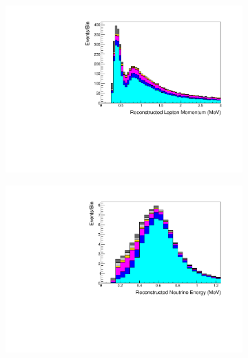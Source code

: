 \begin{figure}[h]
  \begin{subfigure}[t]{0.49\textwidth}
    \includegraphics[width=\textwidth, trim={0mm 0mm 0mm 0mm}, clip,page=1]{Figures/Selections/FHC1Rmu-2020_X.pdf}
  \end{subfigure}%
  \begin{subfigure}[t]{0.49\textwidth}
    \includegraphics[width=\textwidth, trim={0mm 0mm 0mm 0mm}, clip,page=1]{Figures/Selections/FHC1Re-2020_X.pdf}
  \end{subfigure}
  \begin{subfigure}[t]{0.49\textwidth}

\end{subfigure}
\end{figure}
